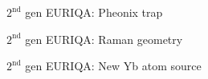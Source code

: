 \documentclass{beamer}
\begin{document}


\begin{frame}{$2^{\text{nd}}$ gen EURIQA: Pheonix trap}
  \begin{center}
    \begin{tikzpicture}
    \end{tikzpicture}
  \end{center}
\end{frame}


\begin{frame}{$2^{\text{nd}}$ gen EURIQA: Raman geometry}
  \begin{center}
    \begin{tikzpicture}
    \end{tikzpicture}
  \end{center}
\end{frame}



\begin{frame}{$2^{\text{nd}}$ gen EURIQA: New Yb atom source}
  \begin{center}
    \begin{tikzpicture}
    \end{tikzpicture}
  \end{center}
\end{frame}
\end{document}
